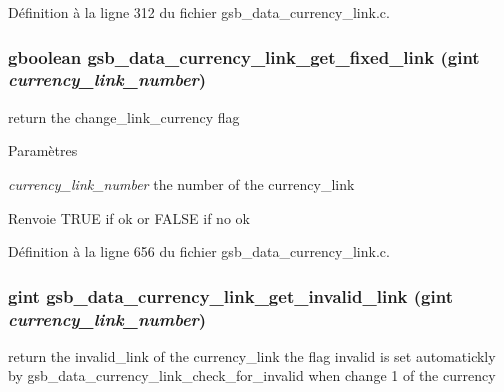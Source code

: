 Définition à la ligne 312 du fichier gsb\_\-data\_\-currency\_\-link.c.

\subsubsection[{gsb\_\-data\_\-currency\_\-link\_\-get\_\-fixed\_\-link}]{\setlength{\rightskip}{0pt plus 5cm}gboolean gsb\_\-data\_\-currency\_\-link\_\-get\_\-fixed\_\-link (gint {\em currency\_\-link\_\-number})}\label{gsb__data__currency__link_8h_a98c2a1a949a837d8a8e81273a1b5597a}
return the change\_\-link\_\-currency flag


\begin{DoxyParams}{Paramètres}
\item[{\em currency\_\-link\_\-number}]the number of the currency\_\-link\end{DoxyParams}
\begin{DoxyReturn}{Renvoie}
TRUE if ok or FALSE if no ok 
\end{DoxyReturn}


Définition à la ligne 656 du fichier gsb\_\-data\_\-currency\_\-link.c.

\subsubsection[{gsb\_\-data\_\-currency\_\-link\_\-get\_\-invalid\_\-link}]{\setlength{\rightskip}{0pt plus 5cm}gint gsb\_\-data\_\-currency\_\-link\_\-get\_\-invalid\_\-link (gint {\em currency\_\-link\_\-number})}\label{gsb__data__currency__link_8h_a43d077a96dc987da2527bb84cf830631}
return the invalid\_\-link of the currency\_\-link the flag invalid is set automatickly by gsb\_\-data\_\-currency\_\-link\_\-check\_\-for\_\-invalid when change 1 of the currency


